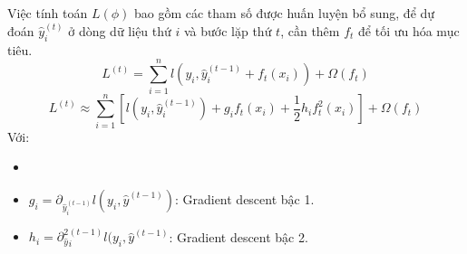 \documentclass[conference]{IEEEtran}
\begin{document}
Việc tính toán \(L(\phi)\) bao gồm các tham số được huấn luyện bổ sung, để dự đoán \( \hat{y}_i^{(t)} \) ở dòng dữ liệu thứ \( i \) và bước lặp thứ \( t \), cần thêm \( f_t \) để tối ưu hóa mục tiêu.
\[
L^{(t)} = \sum_{i=1}^{n} l(y_i, \hat{y}_i^{(t-1)} + f_t(x_i)) + \Omega(f_t)
\]
\[
L^{(t)} \approx \sum_{i=1}^{n} \left[ l(y_i, \hat{y}_i^{(t-1)}) + g_i f_t(x_i) + \frac{1}{2} h_i f_t^2(x_i) \right] + \Omega(f_t)
\]
Với:
\begin{itemize}
    \item \(\)

    \item \(g_i = {\partial_\hat{y}_i^{(t-1)}} l(y_i, \hat{y}^{(t-1)})\): Gradient descent bậc 1.
    \item \( h_i = {\partial^2_\hat{y}_i^{(t-1)}} l(y_i, \hat{y}^{(t-1)} \): Gradient descent bậc 2.
\end{itemize}
\end{document}
